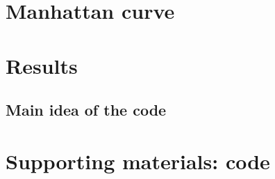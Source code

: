 \documentclass{amsart}
\begin{document}
\section{Manhattan curve}
\section{Results}
\subsection{Main idea of the code}
\section{Supporting materials: code}

\newpage
\end{document}
